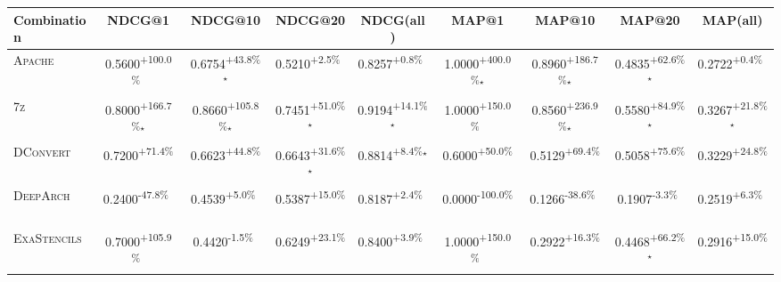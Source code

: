 \begin{table}[htbp]
\centering
\renewcommand{\arraystretch}{1.2}
\begin{tabular}{l|cccc|cccc}
\hline
Combination & NDCG@1 & NDCG@10 & NDCG@20 & NDCG(all) & MAP@1 & MAP@10 & MAP@20 & MAP(all) \\ \hline
\textsc{Apache} & \cellcolor{green!30}0.5600\textsuperscript{+100.0\%}$^{\,\,\,}$ & \cellcolor{green!30}0.6754\textsuperscript{+43.8\%}$^\star$ & \cellcolor{green!30}0.5210\textsuperscript{+2.5\%}$^{\,\,\,}$ & \cellcolor{green!30}0.8257\textsuperscript{+0.8\%}$^{\,\,\,}$ & \cellcolor{green!30}1.0000\textsuperscript{+400.0\%}$^\star$ & \cellcolor{green!30}0.8960\textsuperscript{+186.7\%}$^\star$ & \cellcolor{green!30}0.4835\textsuperscript{+62.6\%}$^\star$ & \cellcolor{green!30}0.2722\textsuperscript{+0.4\%}$^{\,\,\,}$ \\
\textsc{7z} & \cellcolor{green!30}0.8000\textsuperscript{+166.7\%}$^\star$ & \cellcolor{green!30}0.8660\textsuperscript{+105.8\%}$^\star$ & \cellcolor{green!30}0.7451\textsuperscript{+51.0\%}$^\star$ & \cellcolor{green!30}0.9194\textsuperscript{+14.1\%}$^\star$ & \cellcolor{green!30}1.0000\textsuperscript{+150.0\%}$^{\,\,\,}$ & \cellcolor{green!30}0.8560\textsuperscript{+236.9\%}$^\star$ & \cellcolor{green!30}0.5580\textsuperscript{+84.9\%}$^\star$ & \cellcolor{green!30}0.3267\textsuperscript{+21.8\%}$^\star$ \\
\textsc{DConvert} & \cellcolor{green!30}0.7200\textsuperscript{+71.4\%}$^{\,\,\,}$ & \cellcolor{green!30}0.6623\textsuperscript{+44.8\%}$^{\,\,\,}$ & \cellcolor{green!30}0.6643\textsuperscript{+31.6\%}$^\star$ & \cellcolor{green!30}0.8814\textsuperscript{+8.4\%}$^\star$ & \cellcolor{green!30}0.6000\textsuperscript{+50.0\%}$^{\,\,\,}$ & \cellcolor{green!30}0.5129\textsuperscript{+69.4\%}$^{\,\,\,}$ & \cellcolor{green!30}0.5058\textsuperscript{+75.6\%}$^{\,\,\,}$ & \cellcolor{green!30}0.3229\textsuperscript{+24.8\%}$^{\,\,\,}$ \\
\textsc{DeepArch} & \cellcolor{red!30}0.2400\textsuperscript{-47.8\%}$^{\,\,\,}$ & \cellcolor{green!30}0.4539\textsuperscript{+5.0\%}$^{\,\,\,}$ & \cellcolor{green!30}0.5387\textsuperscript{+15.0\%}$^{\,\,\,}$ & \cellcolor{green!30}0.8187\textsuperscript{+2.4\%}$^{\,\,\,}$ & \cellcolor{red!30}0.0000\textsuperscript{-100.0\%}$^{\,\,\,}$ & \cellcolor{red!30}0.1266\textsuperscript{-38.6\%}$^{\,\,\,}$ & \cellcolor{red!30}0.1907\textsuperscript{-3.3\%}$^{\,\,\,}$ & \cellcolor{green!30}0.2519\textsuperscript{+6.3\%}$^{\,\,\,}$ \\
\textsc{ExaStencils} & \cellcolor{green!30}0.7000\textsuperscript{+105.9\%}$^{\,\,\,}$ & \cellcolor{red!30}0.4420\textsuperscript{-1.5\%}$^{\,\,\,}$ & \cellcolor{green!30}0.6249\textsuperscript{+23.1\%}$^{\,\,\,}$ & \cellcolor{green!30}0.8400\textsuperscript{+3.9\%}$^{\,\,\,}$ & \cellcolor{green!30}1.0000\textsuperscript{+150.0\%}$^{\,\,\,}$ & \cellcolor{green!30}0.2922\textsuperscript{+16.3\%}$^{\,\,\,}$ & \cellcolor{green!30}0.4468\textsuperscript{+66.2\%}$^\star$ & \cellcolor{green!30}0.2916\textsuperscript{+15.0\%}$^{\,\,\,}$ \\

\end{tabular}
\end{table}
